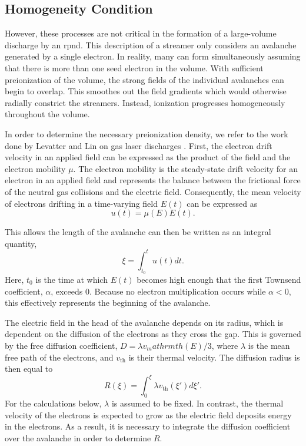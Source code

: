 \subsection{Homogeneity Condition}

However, these processes are not critical in the formation of a large-volume
discharge by an \acs{rpnd}. This description of a streamer only considers an
avalanche generated by a single electron. In reality, many can form
simultaneously assuming that there is more than one seed electron in the volume.
With sufficient preionization of the volume, the strong fields of the
individual avalanches can begin to overlap. This smoothes out the field
gradients which would otherwise radially constrict the streamers. Instead,
ionization progresses homogeneously throughout the volume.

In order to determine the necessary preionization density, we refer to the work
done by Levatter and Lin on gas laser discharges \cite{Levatter1980}. First, the
electron drift velocity in an applied field can be expressed as the product of
the field and the electron mobility $\mu$. The electron mobility is the
steady-state drift velocity for an electron in an applied field and represents
the balance between the frictional force of the neutral gas collisions and the
electric field. Consequently, the mean velocity of electrons drifting in a
time-varying field $E(t)$ can be expressed as
\begin{equation}
  u(t) = \mu(E) E(t).
\end{equation}

This allows the length of the avalanche can then be written as an integral
quantity,
\begin{equation}
  \xi = \int_{t_0}^t u(t) dt.
  \label{eq:s_xi}
\end{equation}
Here, $t_0$ is the time at which $E(t)$ becomes high enough that the first
Townsend coefficient, $\alpha$, exceeds 0. Because no electron multiplication
occurs while $\alpha < 0$, this effectively represents the beginning of the
avalanche.

The electric field in the head of the avalanche depends on its radius, which is
dependent on the diffusion of the electrons as they cross the gap. This is
governed by the free diffusion coefficient, $D = \lambda v_mathrm{th}(E)/3$,
where $\lambda$ is the mean free path of the electrons, and $v_\mathrm{th}$ is
their thermal velocity. The diffusion radius is then equal to
\begin{equation}
  R(\xi) = \int_{0}^{\xi} \lambda v_\mathrm{th}(\xi') d\xi'.
  \label{eq:s_rad}
\end{equation}
For the calculations below, $\lambda$ is assumed to be fixed. In contrast, the
thermal velocity of the electrons is expected to grow as the electric field
deposits energy in the electrons. As a result, it is necessary to integrate the
diffusion coefficient over the avalanche in order to determine $R$.

